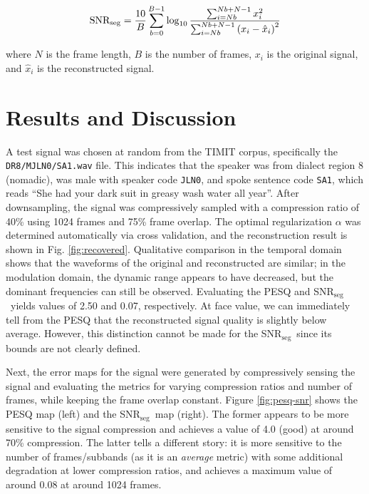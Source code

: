 \documentclass[10pt,a4paper,twoside]{article}
\newcommand{\snrseg}{SNR$_{\mathrm{seg}}$}
\begin{document}
\begin{equation}\label{eq:snrseg}
	\mathrm{SNR_{seg}} = \frac{10}{B} \sum_{b=0}^{B-1} \log_{10} \frac{\sum_{i=Nb}^{Nb+N-1} x_i^2}{\sum_{i=Nb}^{Nb+N-1} \qty(x_i - \hat{x}_i)^2}
\end{equation}

\noindent where $N$ is the frame length, $B$ is the number of frames, $x_i$ is the original signal, and $\hat{x}_i$ is the reconstructed signal.


\section{Results and Discussion}
A test signal was chosen at random from the TIMIT corpus, specifically the \texttt{DR8/MJLN0/SA1.wav} file. This indicates that the speaker was from dialect region 8 (nomadic), was male with speaker code \texttt{JLN0}, and spoke sentence code \texttt{SA1}, which reads ``She had your dark suit in greasy wash water all year''. After downsampling, the signal was compressively sampled with a compression ratio of 40\% using 1024 frames and 75\% frame overlap. The optimal regularization $\alpha$ was determined automatically via cross validation, and the reconstruction result is shown in Fig. \ref{fig:recovered}. Qualitative comparison in the temporal domain shows that the waveforms of the original and reconstructed are similar; in the modulation domain, the dynamic range appears to have decreased, but the dominant frequencies can still be observed. Evaluating the PESQ and \snrseg~yields values of 2.50 and 0.07, respectively. At face value, we can immediately tell from the PESQ that the reconstructed signal quality is slightly below average. However, this distinction cannot be made for the \snrseg~since its bounds are not clearly defined.

Next, the error maps for the signal were generated by compressively sensing the signal and evaluating the metrics for varying compression ratios and number of frames, while keeping the frame overlap constant. Figure \ref{fig:pesq-snr} shows the PESQ map (left) and the \snrseg~map (right). The former appears to be more sensitive to the signal compression and achieves a value of 4.0 (good) at around 70\% compression. The latter tells a different story: it is more sensitive to the number of frames/subbands (as it is an \textit{average} metric) with some additional degradation at lower compression ratios, and achieves a maximum value of around 0.08 at around 1024 frames. 
\end{document}
